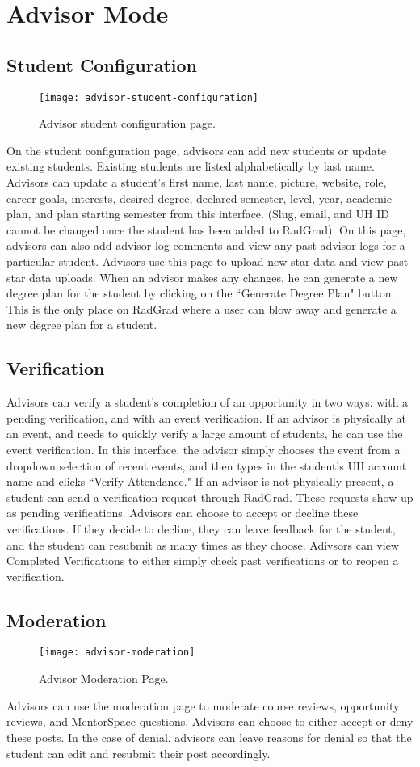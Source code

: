 \section{Advisor Mode}
\subsection{Student Configuration}
\begin{figure}[h]
\centering
\texttt{[image: advisor-student-configuration]}
\caption{Advisor student configuration page.}
\end{figure}
On the student configuration page, advisors can add new students or update existing students. Existing students are listed alphabetically by last name. Advisors can update a student's first name, last name, picture, website, role, career goals, interests, desired degree, declared semester, level, year, academic plan, and plan starting semester from this interface. (Slug, email, and UH ID cannot be changed once the student has been added to RadGrad). On this page, advisors can also add advisor log comments and view any past advisor logs for a particular student. Advisors use this page to upload new star data and view past star data uploads. When an advisor makes any changes, he can generate a new degree plan for the student by clicking on the ``Generate Degree Plan" button. This is the only place on RadGrad where a user can blow away and generate a new degree plan for a student.
\subsection{Verification}
Advisors can verify a student's completion of an opportunity in two ways: with a pending verification, and with an event verification. If an advisor is physically at an event, and needs to quickly verify a large amount of students, he can use the event verification. In this interface, the advisor simply chooses the event from a dropdown selection of recent events, and then types in the student's UH account name and clicks ``Verify Attendance." If an advisor is not physically present, a student can send a verification request through RadGrad. These requests show up as pending verifications. Advisors can choose to accept or decline these verifications. If they decide to decline, they can leave feedback for the student, and the student can resubmit as many times as they choose. Adivsors can view Completed Verifications to either simply check past verifications or to reopen a verification.
\subsection{Moderation}
\begin{figure}[h]
\centering
\texttt{[image: advisor-moderation]}
\caption{Advisor Moderation Page.}
\end{figure}
Advisors can use the moderation page to moderate course reviews, opportunity reviews, and MentorSpace questions. Advisors can choose to either accept or deny these posts. In the case of denial, advisors can leave reasons for denial so that the student can edit and resubmit their post accordingly. 
